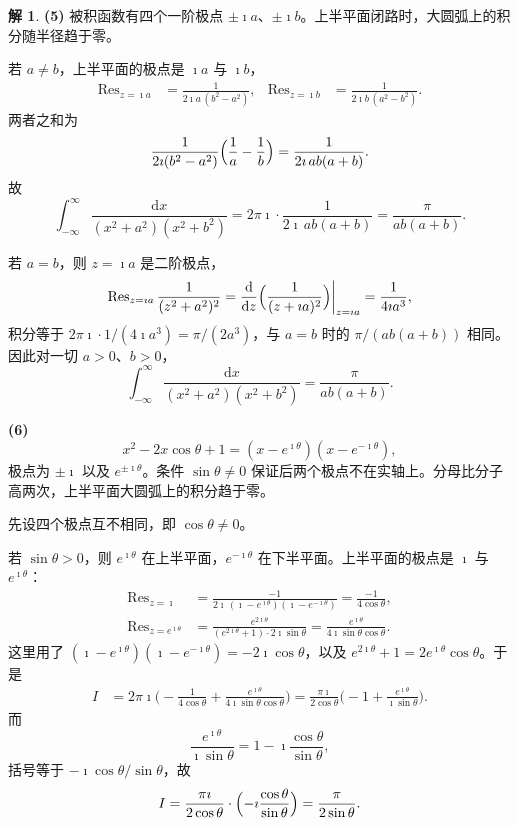 \documentclass[11pt]{article}
\newcommand{\Res}{\operatorname{Res}}
\theoremstyle{remark}
\theoremstyle{definition}
\newtheorem{solution}{解}
\begin{document}
\begin{solution}
\textbf{(5)}
被积函数有四个一阶极点 $\pm\imath a$、$\pm\imath b$。上半平面闭路时，大圆弧上的积分随半径趋于零。

若 $a\neq b$，上半平面的极点是 $\imath a$ 与 $\imath b$，
\begin{align*}
\Res_{z=\imath a}
&=\frac{1}{2\imath a\,(b^{2}-a^{2})},&
\Res_{z=\imath b}
&=\frac{1}{2\imath b\,(a^{2}-b^{2})}.
\end{align*}
两者之和为
\[
\frac{1}{2\imath(b^{2}-a^{2})}\Bigl(\frac{1}{a}-\frac{1}{b}\Bigr)
=\frac{1}{2\imath\, ab(a+b)}.
\]
故
\[
\int_{-\infty}^{\infty}\frac{\mathrm{d}x}{(x^{2}+a^{2})(x^{2}+b^{2})}
=2\pi\imath\cdot\frac{1}{2\imath\, ab(a+b)}
=\frac{\pi}{ab(a+b)}.
\]

若 $a=b$，则 $z=\imath a$ 是二阶极点，
\[
\Res_{z=\imath a}\frac{1}{(z^{2}+a^{2})^{2}}
=\frac{\mathrm{d}}{\mathrm{d}z}\Bigl(\frac{1}{(z+\imath a)^{2}}\Bigr)\bigg|_{z=\imath a}
=\frac{1}{4\imath a^{3}},
\]
积分等于 $2\pi\imath\cdot 1/(4\imath a^{3})=\pi/(2a^{3})$，与 $a=b$ 时的 $\pi/(ab(a+b))$ 相同。因此对一切 $a>0$、$b>0$，
\[
\int_{-\infty}^{\infty}\frac{\mathrm{d}x}{(x^{2}+a^{2})(x^{2}+b^{2})}
=\frac{\pi}{ab(a+b)}.
\]

\textbf{(6)}
\[
x^{2}-2x\cos\theta+1=(x-e^{\imath\theta})(x-e^{-\imath\theta}),
\]
极点为 $\pm\imath$ 以及 $e^{\pm\imath\theta}$。条件 $\sin\theta\neq 0$ 保证后两个极点不在实轴上。分母比分子高两次，上半平面大圆弧上的积分趋于零。

先设四个极点互不相同，即 $\cos\theta\neq 0$。

若 $\sin\theta>0$，则 $e^{\imath\theta}$ 在上半平面，$e^{-\imath\theta}$ 在下半平面。上半平面的极点是 $\imath$ 与 $e^{\imath\theta}$：
\begin{align*}
\Res_{z=\imath}
&=\frac{-1}{2\imath\,(\imath-e^{\imath\theta})(\imath-e^{-\imath\theta})}
=\frac{-1}{4\cos\theta},\\[4pt]
\Res_{z=e^{\imath\theta}}
&=\frac{e^{2\imath\theta}}{(e^{2\imath\theta}+1)\cdot 2\imath\sin\theta}
=\frac{e^{\imath\theta}}{4\imath\sin\theta\cos\theta}.
\end{align*}
这里用了 $(\imath-e^{\imath\theta})(\imath-e^{-\imath\theta})=-2\imath\cos\theta$，以及 $e^{2\imath\theta}+1=2e^{\imath\theta}\cos\theta$。于是
\begin{align*}
I
&=2\pi\imath\Biggl(
-\frac{1}{4\cos\theta}
+\frac{e^{\imath\theta}}{4\imath\sin\theta\cos\theta}
\Biggr)
=\frac{\pi\imath}{2\cos\theta}
\Biggl(-1+\frac{e^{\imath\theta}}{\imath\sin\theta}\Biggr).
\end{align*}
而
\[
\frac{e^{\imath\theta}}{\imath\sin\theta}
=1-\imath\frac{\cos\theta}{\sin\theta},
\]
括号等于 $-\imath\cos\theta/\sin\theta$，故
\[
I=\frac{\pi\imath}{2\cos\theta}\cdot\Bigl(-\imath\frac{\cos\theta}{\sin\theta}\Bigr)
=\frac{\pi}{2\sin\theta}.
\]


\end{solution}
\end{document}
